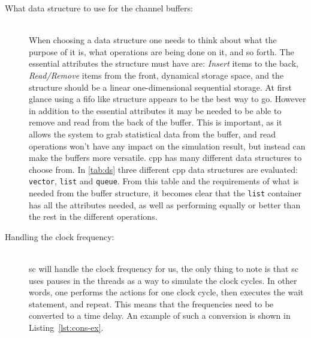 \documentclass[a4paper, 12pt]{report}
\newcommand{\codeword}[1]{\texttt{#1}}
\begin{document}
\begin{description}
	\item[What data structure to use for the channel buffers:] \hfill \\
  When choosing a data structure one needs to think about what the purpose of it is, what operations are being done on it, and so forth.
		The essential attributes the structure must have are: \textit{Insert} items to the back, \textit{Read/Remove} items from the front, dynamical storage space, and the structure should be a linear one-dimensional sequential storage.
		At first glance using a \gls{fifo} like structure appears to be the best way to go.
		However in addition to the essential attributes it may be needed to be able to remove and read from the back of the buffer.
		This is important, as it allows the system to grab statistical data from the buffer, and read operations won't have any impact on the simulation result, but instead can make the buffers more versatile.
		\gls{cpp} has many different data structures to choose from.		
		In \ref{tab:ds} three different \gls{cpp} data structures are evaluated: \codeword{vector}, \codeword{list} and \codeword{queue}.
		From this table and the requirements of what is needed from the buffer structure, it becomes clear that the \codeword{list} container has all the attributes needed, as well as performing equally or better than the rest in the different operations.
	\item[Handling the clock frequency:] \hfill \\
		\gls{sc} will handle the clock frequency for us, the only thing to note is that \gls{sc} uses pauses in the threads as a way to simulate the clock cycles.
		In other words, one performs the actions for one clock cycle, then executes the wait statement, and repeat.
		This means that the frequencies need to be converted to a time delay.	
		An example of such a conversion is shown in Listing~\ref{lst:cons-ex}.
	
\end{description}
\end{document}
